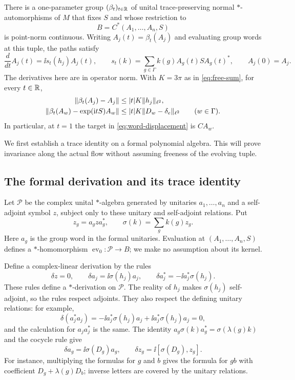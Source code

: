 \begin{proposition}
\label{prop:flow}
There is a one-parameter group $(\beta_t)_{t\in\mathbb R}$ of unital
trace-preserving normal $*$-automorphisms of $M$ that fixes $S$ and
whose restriction to
\[
 B=C^*(A_1,\ldots,A_n,S)
\]
is point-norm continuous. Writing $A_j(t)=\beta_t(A_j)$ and evaluating
group words at this tuple, the paths satisfy
\begin{equation}
 \frac{d}{dt}A_j(t)=\ii s_t(h_j)A_j(t),\qquad
 s_t(k)=\sum_{g\in\Gamma}k(g)A_g(t)SA_g(t)^*,\qquad A_j(0)=A_j.
 \label{eq:flow-ode}
\end{equation}
The derivatives here are in operator norm. With $K=3\pi$ as in
\eqref{eq:free-sum}, for every $t\in\mathbb R$,
\begin{align}
 \left\lVert \beta_t(A_j)-A_j\right\rVert
 &\leq |t|K\|h_j\|_{\ell^2},
 \label{eq:generator-displacement}\\
 \left\lVert \beta_t(A_w)-\exp(\mathrm i tS)A_w\right\rVert
 &\leq |t|K\|D_w-\delta_e\|_{\ell^2}
 \qquad(w\in\Gamma).
 \label{eq:word-displacement}
\end{align}
In particular, at $t=1$ the target in
\eqref{eq:word-displacement} is $CA_w$.
\end{proposition}

We first establish a trace identity on a formal polynomial algebra.
This will prove invariance along the actual flow without assuming
freeness of the evolving tuple.

\subsection{The formal derivation and its trace identity}

Let $\mathcal P$ be the complex unital $*$-algebra generated by
unitaries $a_1,\ldots,a_n$ and a self-adjoint symbol $z$, subject only
to these unitary and self-adjoint relations. Put
\[
 z_g=a_gza_g^*,\qquad \sigma(k)=\sum_gk(g)z_g.
\]
Here $a_g$ is the group word in the formal unitaries. Evaluation at
$(A_1,\ldots,A_n,S)$ defines a $*$-homomorphism
$\operatorname{ev}_0:\mathcal P\to B$; we make no assumption about
its kernel.

Define a complex-linear derivation by the rules
\begin{equation}
 \delta z=0,\qquad
 \delta a_j=\ii\sigma(h_j)a_j,\qquad
 \delta a_j^*=-\ii a_j^*\sigma(h_j).
 \label{eq:formal-derivation}
\end{equation}
These rules define a $*$-derivation on $\mathcal P$. The reality of
$h_j$ makes $\sigma(h_j)$ self-adjoint, so the rules respect
adjoints. They also respect the defining unitary relations: for
example,
\[
 \delta(a_j^*a_j)
 =-\ii a_j^*\sigma(h_j)a_j+\ii a_j^*\sigma(h_j)a_j=0,
\]
and the calculation for $a_ja_j^*$ is the same.
The identity
$a_g\sigma(k)a_g^*=\sigma(\lambda(g)k)$ and the cocycle rule give
\begin{equation}
 \delta a_g=\ii\sigma(D_g)a_g,
 \qquad
 \delta z_g=\ii[\sigma(D_g),z_g].
 \label{eq:formal-word-derivative}
\end{equation}
For instance, multiplying the formulas for $g$ and $b$ gives the
formula for $gb$ with coefficient $D_g+\lambda(g)D_b$; inverse
letters are covered by the unitary relations.

